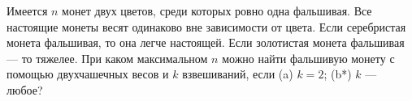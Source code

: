 Имеется $n$ монет двух цветов, среди которых ровно одна фальшивая. Все настоящие монеты весят одинаково вне зависимости от цвета. Если серебристая монета фальшивая, то она легче настоящей. Если золотистая монета фальшивая --- то тяжелее. При каком максимальном $n$ можно найти фальшивую монету с помощью двухчашечных весов и $k$ взвешиваний, если (a) $k = 2$; (b*) $k$ --- любое?